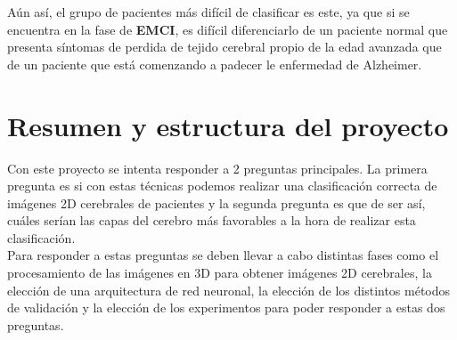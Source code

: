 Aún así, el grupo de pacientes más difícil de clasificar es este, ya que si se encuentra en la fase de \textbf{EMCI}, es difícil diferenciarlo de un paciente normal que presenta síntomas de perdida de tejido cerebral propio de la edad avanzada que de un paciente que está comenzando a padecer le enfermedad de Alzheimer.\\

\section{Resumen y estructura del proyecto}

Con este proyecto se intenta responder a 2 preguntas principales. La primera pregunta es si con estas técnicas podemos realizar una clasificación correcta de imágenes 2D cerebrales de pacientes y la segunda pregunta es que de ser así, cuáles serían las capas del cerebro más favorables a la hora de realizar esta clasificación.\\

Para responder a estas preguntas se deben llevar a cabo distintas fases como el procesamiento de las imágenes en 3D para obtener imágenes 2D cerebrales, la elección de una arquitectura de red neuronal, la elección de los distintos métodos de validación y la elección de los experimentos para poder responder a estas dos preguntas.\\


